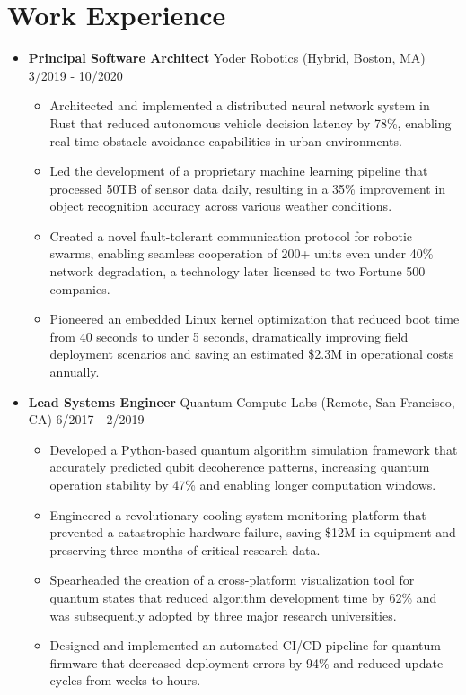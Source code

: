 \documentclass[11pt]{article}
\begin{document}
\section*{\headingfont Work Experience}

\begin{itemize}[noitemsep, topsep=0pt, itemsep=1.5em, label=, leftmargin=0em]
\item \textbf{Principal Software Architect} \textperiodcentered Yoder Robotics (Hybrid, Boston, MA) \hfill 3/2019 - 10/2020

\begin{itemize}[label=›, noitemsep, topsep=0pt, leftmargin=1em]
	\item Architected and implemented a distributed neural network system in Rust that reduced autonomous vehicle decision latency by 78\%, enabling real-time obstacle avoidance capabilities in urban environments.
	\item Led the development of a proprietary machine learning pipeline that processed 50TB of sensor data daily, resulting in a 35\% improvement in object recognition accuracy across various weather conditions.
	\item Created a novel fault-tolerant communication protocol for robotic swarms, enabling seamless cooperation of 200+ units even under 40\% network degradation, a technology later licensed to two Fortune 500 companies.
	\item Pioneered an embedded Linux kernel optimization that reduced boot time from 40 seconds to under 5 seconds, dramatically improving field deployment scenarios and saving an estimated \$2.3M in operational costs annually.
\end{itemize}

\item \textbf{Lead Systems Engineer} \textperiodcentered Quantum Compute Labs (Remote, San Francisco, CA) \hfill 6/2017 - 2/2019

\begin{itemize}[label=›, noitemsep, topsep=0pt, leftmargin=1em]
	\item Developed a Python-based quantum algorithm simulation framework that accurately predicted qubit decoherence patterns, increasing quantum operation stability by 47\% and enabling longer computation windows.
	\item Engineered a revolutionary cooling system monitoring platform that prevented a catastrophic hardware failure, saving \$12M in equipment and preserving three months of critical research data.
	\item Spearheaded the creation of a cross-platform visualization tool for quantum states that reduced algorithm development time by 62\% and was subsequently adopted by three major research universities.
	\item Designed and implemented an automated CI/CD pipeline for quantum firmware that decreased deployment errors by 94\% and reduced update cycles from weeks to hours.
\end{itemize}


\end{itemize}
\end{document}
